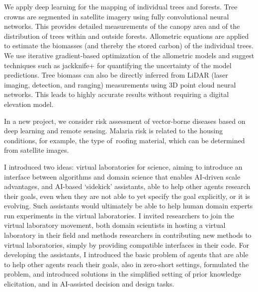 We apply deep learning for the mapping of individual trees and forests. Tree crowns are segmented in satellite imagery using fully convolutional neural networks. This provides detailed measurements of the canopy area and of the distribution of trees within and outside forests. Allometric equations are applied to estimate the biomasses (and thereby the stored carbon) of the individual trees. We use iterative gradient-based optimization of the allometric models and suggest techniques such as  jackknife+ for quantifying the uncertainty of the model predictions. Tree biomass can also be directly inferred from LiDAR (laser imaging, detection, and ranging) measurements using 3D point cloud neural networks. This leads to highly accurate results without requiring a digital elevation model. 

In a new project, we consider risk assessment of vector-borne diseases based on deep learning and remote sensing. Malaria risk is related to the housing conditions, for example, the type of roofing material, which can be determined from satellite images.

\license

I introduced two ideas: virtual laboratories for science, aiming to introduce an interface between algorithms and domain science that enables AI-driven scale advantages, and AI-based ‘sidekick’ assistants, able to help other agents research their goals, even when they are not able to yet specify the goal explicitly, or it is evolving. Such assistants would ultimately be able to help human domain experts run experiments in the virtual laboratories. I invited researchers to join the virtual laboratory movement, both domain scientists in hosting a virtual laboratory in their field and methods researchers in contributing new methods to virtual laboratories, simply by providing compatible interfaces in their code. For developing the assistants, I introduced the basic problem of agents that are able to help other agents reach their goals, also in zero-short settings, formulated the problem, and introduced solutions in the simplified setting of prior knowledge elicitation, and in AI-assisted decision and design tasks.

\license

